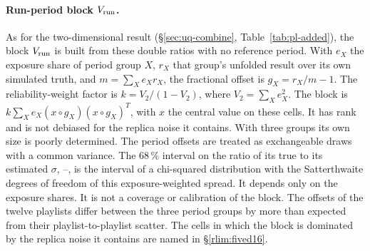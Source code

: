 \paragraph{Run-period block $V_{\mathrm{run}}$.} As for the two-dimensional result (\S\ref{sec:uq-combine}, Table~\ref{tab:pl-added}), the block $V_{\mathrm{run}}$ is built from these double ratios with no reference period. With $e_X$ the exposure share of period group $X$, $r_X$ that group's unfolded result over its own simulated truth, and $m=\sum_X e_X r_X$, the fractional offset is $g_X=r_X/m-1$. The reliability-weight factor is $k=V_2/(1-V_2)$, where $V_2=\sum_X e_X^2$. The block is $k\sum_X e_X (x\circ g_X)(x\circ g_X)^{T}$, with $x$ the central value on these cells. It has rank  and is not debiased for the replica noise it contains. With three groups its own size is poorly determined. The period offsets are treated as exchangeable draws with a common variance. The 68\,\% interval on the ratio of its true to its estimated $\sigma$, --, is the interval of a chi-squared distribution with the Satterthwaite degrees of freedom of this exposure-weighted spread. It depends only on the exposure shares. It is not a coverage or calibration of the block. The offsets of the twelve playlists differ between the three period groups by more than expected from their playlist-to-playlist scatter. The cells in which the block is dominated by the replica noise it contains are named in \S\ref{rlim:fived16}.
